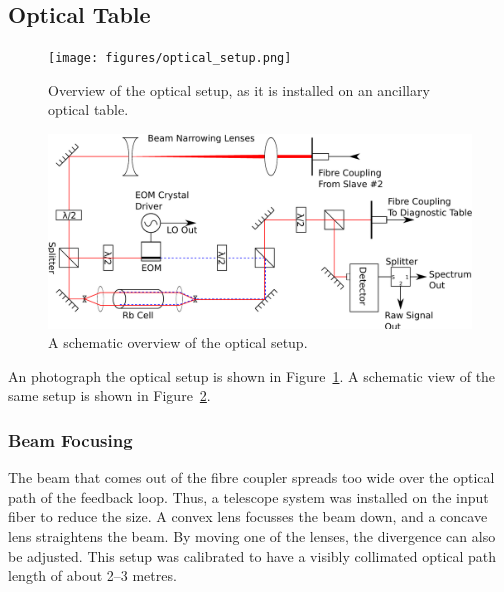 
\subsection{Optical Table}

\begin{figure}
  \texttt{[image: figures/optical\_setup.png]}
  \centering\caption{Overview of the optical setup, as it is installed on an ancillary optical table.}
  \label{optical_setup}
\end{figure}

\begin{figure}
  \includegraphics[width=\textwidth]{figures/optics.pdf}
  \centering\caption{A schematic overview of the optical setup.}
  \label{optics}
\end{figure}

An photograph the optical setup is shown in Figure~\ref{optical_setup}.  A schematic view of the same setup is shown in Figure~\ref{optics}.

    \subsubsection{Beam Focusing}

The beam that comes out of the fibre coupler spreads too wide over the optical path of the feedback loop.  Thus, a telescope system was installed on the input fiber to reduce the size. A convex lens focusses the beam down, and a concave lens straightens the beam. By moving one of the lenses, the divergence can also be adjusted. This setup was calibrated to have a visibly collimated optical path length of about 2--3 metres. \\

